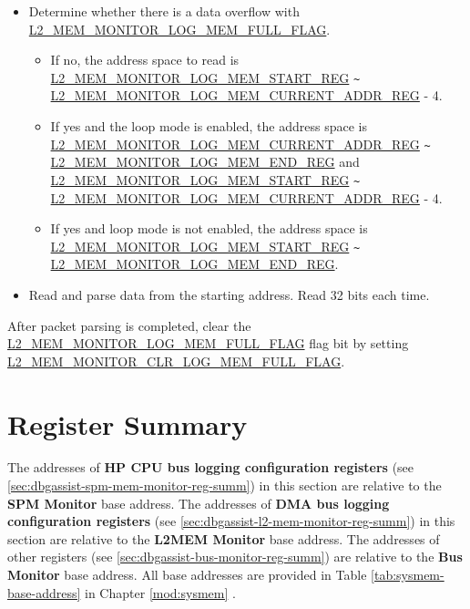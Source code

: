 \documentclass[main\_\_EN.tex]{subfiles}
\begin{document}
\begin{itemize}
    \item Determine whether there is a data overflow with \hyperref[fielddesc:L2MEMMONITORLOGMEMFULLFLAG]{L2\_MEM\_MONITOR\_LOG\_MEM\_FULL\_FLAG}.
    \begin{itemize}
        \item If no, the address space to read is \hyperref[regdesc:L2MEMMONITORLOGMEMSTARTREG]{L2\_MEM\_MONITOR\_LOG\_MEM\_START\_REG}  \verb+~+ \hyperref[regdesc:L2MEMMONITORLOGMEMCURRENTADDRREG]{L2\_MEM\_MONITOR\_LOG\_MEM\_CURRENT\_ADDR\_REG} - 4.
        \item If yes and the loop mode is enabled, the address space is \hyperref[regdesc:L2MEMMONITORLOGMEMCURRENTADDRREG]{L2\_MEM\_MONITOR\_LOG\_MEM\_CURRENT\_ADDR\_REG} \verb+~+ \hyperref[regdesc:L2MEMMONITORLOGMEMENDREG]{L2\_MEM\_MONITOR\_LOG\_MEM\_END\_REG} and \hyperref[regdesc:L2MEMMONITORLOGMEMSTARTREG]{L2\_MEM\_MONITOR\_LOG\_MEM\_START\_REG} \verb+~+ \hyperref[regdesc:L2MEMMONITORLOGMEMCURRENTADDRREG]{L2\_MEM\_MONITOR\_LOG\_MEM\_CURRENT\_ADDR\_REG} - 4.
        \item If yes and loop mode is not enabled, the address space is \hyperref[regdesc:L2MEMMONITORLOGMEMSTARTREG]{L2\_MEM\_MONITOR\_LOG\_MEM\_START\_REG} \verb+~+ \hyperref[regdesc:L2MEMMONITORLOGMEMENDREG]{L2\_MEM\_MONITOR\_LOG\_MEM\_END\_REG}.
    \end{itemize}
    \item Read and parse data from the starting address. Read 32 bits each time.
\end{itemize}

After packet parsing is completed, clear the \hyperref[fielddesc:L2MEMMONITORLOGMEMFULLFLAG]{L2\_MEM\_MONITOR\_LOG\_MEM\_FULL\_FLAG} flag bit by setting \hyperref[fielddesc:L2MEMMONITORCLRLOGMEMFULLFLAG]{L2\_MEM\_MONITOR\_CLR\_LOG\_MEM\_FULL\_FLAG}.



\newpage
\hypertarget{dbgassist-reg-summ}{}
\section{Register Summary}
\label{sec:dbgassist-reg-summ}

The addresses of \textbf{HP CPU bus logging configuration registers} (see \ref{sec:dbgassist-spm-mem-monitor-reg-summ}) in this section are relative to the \textbf{SPM Monitor} base address. The addresses of \textbf{DMA bus logging configuration registers} (see \ref{sec:dbgassist-l2-mem-monitor-reg-summ}) in this section are relative to the \textbf{L2MEM Monitor} base address. The addresses of other registers (see \ref{sec:dbgassist-bus-monitor-reg-summ}) are relative to the \textbf{Bus Monitor} base address. All base addresses are provided in Table \ref{tab:sysmem-base-address} in Chapter \ref{mod:sysmem} \textit{}.
\end{document}
